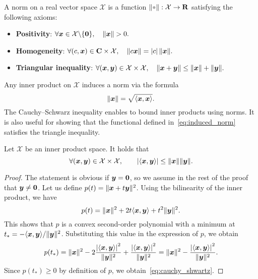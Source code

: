 \begin{definition}
A norm on a real vector space $\mathcal X$ is a function $\norm{\placeholder}: \mathcal X \to \real$ satisfying the following axioms:
\begin{itemize}
    \item
        \textbf{Positivity}:
        \(
            \forall \mathbf{\boldsymbol{x}} \in \mathcal X \backslash \{\mathbf{\boldsymbol{0}}\}, \quad
            \lVert\mathbf{\boldsymbol{x}}\rVert > 0.
        \)

    \item
        \textbf{Homogeneity}:
        \(
            \forall (c, \mathbf{\boldsymbol{x}}) \in \mathbf C \times \mathcal X, \quad
            \lVert c \mathbf{\boldsymbol{x}}\rVert = \lvert c\rvert \, \lVert\mathbf{\boldsymbol{x}}\rVert .
        \)

    \item
        \textbf{Triangular inequality}:
        \(
            \forall (\mathbf{\boldsymbol{x}}, \mathbf{\boldsymbol{y}}) \in \mathcal X \times \mathcal X, \quad
            \lVert\mathbf{\boldsymbol{x}} + \mathbf{\boldsymbol{y}}\rVert \leq \lVert\mathbf{\boldsymbol{x}}\rVert + \lVert\mathbf{\boldsymbol{y}}\rVert.
        \)
\end{itemize}
\end{definition}
Any inner product on $\mathcal X$ induces a norm via the formula
\begin{equation}
    \label{eq:induced_norm}%
    \norm{\vect x} = \sqrt{\ip{\vect x, \vect x}}.
\end{equation}
The Cauchy--Schwarz inequality enables to bound inner products using norms.
It is also useful for showing that the functional defined in~\eqref{eq:induced_norm} satisfies the triangle inequality.
\begin{proposition}
    \label{proposition:cauchy_shwartz}
    Let $\mathcal X$ be an inner product space.
    It holds that
    \begin{equation}
        \label{eq:cauchy_shwartz}
        \forall  (\vect x, \vect y) \in \mathcal X \times \mathcal X, \qquad
        \abs[big]{\ip{\vect x, \vect y}} \leq \norm{\vect x} \norm{\vect y}.
    \end{equation}
\end{proposition}
\begin{proof}
    The statement is obvious if $\mathbf{\boldsymbol{y}} = \mathbf{\boldsymbol{0}}$,
    so we assume in the rest of the proof that $\mathbf{\boldsymbol{y}} \neq \mathbf{\boldsymbol{0}}$.
    Let us define $p(t) = \lVert\mathbf{\boldsymbol{x}} + t \mathbf{\boldsymbol{y}}\rVert^2$.
    Using the bilinearity of the inner product,
    we have
    \[
        p(t) = \lVert\mathbf{\boldsymbol{x}}\rVert^2 + 2 t \langle\mathbf{\boldsymbol{x}}, \mathbf{\boldsymbol{y}}\rangle + t^2 \lVert\mathbf{\boldsymbol{y}}\rVert^2.
    \]
    This shows that $p$ is a convex second-order polynomial with a minimum at $t_* = - \langle\mathbf{\boldsymbol{x}}, \mathbf{\boldsymbol{y}}\rangle / \lVert\mathbf{\boldsymbol{y}}\rVert^2$.
    Substituting this value in the expression of $p$,
    we obtain
    \[
        p(t_*) = \norm{\vect x}^2 - 2 \frac{\abs[big]{\ip{\vect x, \vect y}}^2}{\norm{\vect y}^2} +  \frac{\abs[big]{\ip{\vect x, \vect y}}^2}{\norm{\vect y}^2}
        = \norm{\vect x}^2 - \frac{\abs[big]{\ip{\vect x, \vect y}}^2}{\norm{\vect y}^2}.
    \]
    Since $p(t_*) \geq 0$ by definition of $p$,
    we obtain~\eqref{eq:cauchy_shwartz}.
\end{proof}

